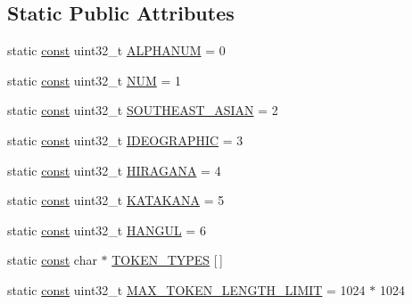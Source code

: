 \subsection*{Static Public Attributes}
\begin{DoxyCompactItemize}
\item 
static \mbox{\hyperlink{ZlibCrc32_8h_a2c212835823e3c54a8ab6d95c652660e}{const}} uint32\+\_\+t \mbox{\hyperlink{classlucene_1_1core_1_1analysis_1_1standard_1_1StandardTokenizer_a89e87742cc1d983b876602ddf7c4d823}{A\+L\+P\+H\+A\+N\+UM}} = 0
\item 
static \mbox{\hyperlink{ZlibCrc32_8h_a2c212835823e3c54a8ab6d95c652660e}{const}} uint32\+\_\+t \mbox{\hyperlink{classlucene_1_1core_1_1analysis_1_1standard_1_1StandardTokenizer_a0cc5d40f8afa24869c28e26a21ac9a9a}{N\+UM}} = 1
\item 
static \mbox{\hyperlink{ZlibCrc32_8h_a2c212835823e3c54a8ab6d95c652660e}{const}} uint32\+\_\+t \mbox{\hyperlink{classlucene_1_1core_1_1analysis_1_1standard_1_1StandardTokenizer_a325a7c52ff70ac6004472ce67d2c195d}{S\+O\+U\+T\+H\+E\+A\+S\+T\+\_\+\+A\+S\+I\+AN}} = 2
\item 
static \mbox{\hyperlink{ZlibCrc32_8h_a2c212835823e3c54a8ab6d95c652660e}{const}} uint32\+\_\+t \mbox{\hyperlink{classlucene_1_1core_1_1analysis_1_1standard_1_1StandardTokenizer_a7819d2406e5c2e852740b5123736e66e}{I\+D\+E\+O\+G\+R\+A\+P\+H\+IC}} = 3
\item 
static \mbox{\hyperlink{ZlibCrc32_8h_a2c212835823e3c54a8ab6d95c652660e}{const}} uint32\+\_\+t \mbox{\hyperlink{classlucene_1_1core_1_1analysis_1_1standard_1_1StandardTokenizer_a9493d33d2e50179798c89ee7e21de4c8}{H\+I\+R\+A\+G\+A\+NA}} = 4
\item 
static \mbox{\hyperlink{ZlibCrc32_8h_a2c212835823e3c54a8ab6d95c652660e}{const}} uint32\+\_\+t \mbox{\hyperlink{classlucene_1_1core_1_1analysis_1_1standard_1_1StandardTokenizer_a3177ce400602ef55696803cdf9cf6bd1}{K\+A\+T\+A\+K\+A\+NA}} = 5
\item 
static \mbox{\hyperlink{ZlibCrc32_8h_a2c212835823e3c54a8ab6d95c652660e}{const}} uint32\+\_\+t \mbox{\hyperlink{classlucene_1_1core_1_1analysis_1_1standard_1_1StandardTokenizer_aaafb4ee36c04de9e70b96bfa4b3ffd71}{H\+A\+N\+G\+UL}} = 6
\item 
static \mbox{\hyperlink{ZlibCrc32_8h_a2c212835823e3c54a8ab6d95c652660e}{const}} char $\ast$ \mbox{\hyperlink{classlucene_1_1core_1_1analysis_1_1standard_1_1StandardTokenizer_a565064bb569766d9345ab41fdd699cb0}{T\+O\+K\+E\+N\+\_\+\+T\+Y\+P\+ES}} \mbox{[}$\,$\mbox{]}
\item 
static \mbox{\hyperlink{ZlibCrc32_8h_a2c212835823e3c54a8ab6d95c652660e}{const}} uint32\+\_\+t \mbox{\hyperlink{classlucene_1_1core_1_1analysis_1_1standard_1_1StandardTokenizer_ad5781b94208ea9b696dc91efac36e80d}{M\+A\+X\+\_\+\+T\+O\+K\+E\+N\+\_\+\+L\+E\+N\+G\+T\+H\+\_\+\+L\+I\+M\+IT}} = 1024 $\ast$ 1024
\end{DoxyCompactItemize}
